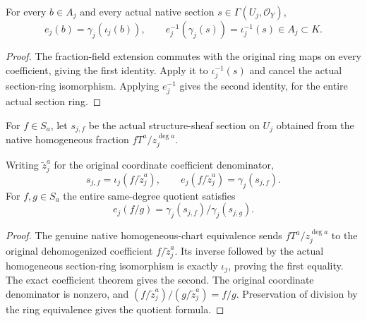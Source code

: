 \begin{theorem}
\label{thm:seven-native-original-field-coefficients}
\leanok
For every $b\in A_j$ and every actual native section
$s\in\Gamma(U_j,\mathcal O_Y)$,
\[
 e_j(b)=\gamma_j(\iota_j(b)),\qquad
 e_j^{-1}(\gamma_j(s))=\iota_j^{-1}(s)\in A_j\subset K.
\]
\end{theorem}
\begin{proof}
The fraction-field extension commutes with the original ring maps on every
coefficient, giving the first identity. Apply it to $\iota_j^{-1}(s)$ and
cancel the actual section-ring isomorphism. Applying $e_j^{-1}$ gives the
second identity, for the entire actual section ring.
\end{proof}

\begin{definition}
\label{def:seven-native-original-homogeneous-section}
\leanok
For $f\in S_a$, let $s_{j,f}$ be the actual structure-sheaf section on $U_j$
obtained from the native homogeneous fraction $fT^a/z_j^{\deg a}$.
\end{definition}

\begin{lemma}
\label{lem:seven-native-original-homogeneous-germs}
\leanok
Writing $\widetilde z_j^a$ for the original coordinate coefficient denominator,
\[
 s_{j,f}=\iota_j(f/\widetilde z_j^a),\qquad
 e_j(f/\widetilde z_j^a)=\gamma_j(s_{j,f}).
\]
For $f,g\in S_a$ the entire same-degree quotient satisfies
\[
 e_j(f/g)=\gamma_j(s_{j,f})/\gamma_j(s_{j,g}).
\]
\end{lemma}
\begin{proof}
The genuine native homogeneous-chart equivalence sends
$fT^a/z_j^{\deg a}$ to the original dehomogenized coefficient
$f/\widetilde z_j^a$. Its inverse followed by the actual homogeneous
section-ring isomorphism is exactly $\iota_j$, proving the first equality.
The exact coefficient theorem gives the second. The original coordinate
denominator is nonzero, and
$(f/\widetilde z_j^a)/(g/\widetilde z_j^a)=f/g$.
Preservation of division by the ring equivalence gives the quotient formula.
\end{proof}

